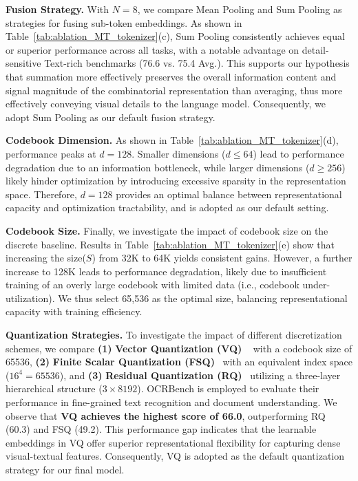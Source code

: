 \documentclass[11pt, a4paper, logo, copyright]{googledeepmind}
\begin{document}
\textbf{Fusion Strategy.}
With $N=8$, we compare Mean Pooling and Sum Pooling as strategies for fusing sub-token embeddings. As shown in Table~\ref{tab:ablation_MT_tokenizer}(c), Sum Pooling consistently achieves equal or superior performance across all tasks, with a notable advantage on detail-sensitive Text-rich benchmarks (76.6 vs. 75.4 Avg.). This supports our hypothesis that summation more effectively preserves the overall information content and signal magnitude of the combinatorial representation than averaging, thus more effectively conveying visual details to the language model. Consequently, we adopt Sum Pooling as our default fusion strategy.

\textbf{Codebook Dimension.}
As shown in Table~\ref{tab:ablation_MT_tokenizer}(d), performance peaks at $d=128$. Smaller dimensions ($d \le 64$) lead to performance degradation due to an information bottleneck, while larger dimensions ($d \ge 256$) likely hinder optimization by introducing excessive sparsity in the representation space. Therefore, $d=128$ provides an optimal balance between representational capacity and optimization tractability, and is adopted as our default setting.


\textbf{Codebook Size.}
Finally, we investigate the impact of codebook size on the discrete baseline. Results in Table~\ref{tab:ablation_MT_tokenizer}(e) show that increasing the size($S$) from 32K to 64K yields consistent gains. However, a further increase to 128K leads to performance degradation, likely due to insufficient training of an overly large codebook with limited data (i.e., codebook under-utilization). We thus select 65,536 as the optimal size, balancing representational capacity with training efficiency.

\textbf{Quantization Strategies.}
To investigate the impact of different discretization schemes, we compare \textbf{(1)} \textbf{Vector Quantization (VQ)} ~\citep{van2017neural,zhu2025addressing} with a codebook size of 65536, \textbf{(2)} \textbf{Finite Scalar Quantization (FSQ)}~\citep{mentzer2023finite} with an equivalent index space ($16^4 = 65536$), and \textbf{(3)} \textbf{Residual Quantization (RQ)}~\citep{lee2022autoregressive} utilizing a three-layer hierarchical structure ($3 \times 8192$). 
OCRBench is employed to evaluate their performance in fine-grained text recognition and document understanding. 
We observe that \textbf{VQ achieves the highest score of 66.0}, outperforming RQ (60.3) and FSQ (49.2). This performance gap indicates that the learnable embeddings in VQ offer superior representational flexibility for capturing dense visual-textual features. 
Consequently, VQ is adopted as the default quantization strategy for our final model.
\end{document}
